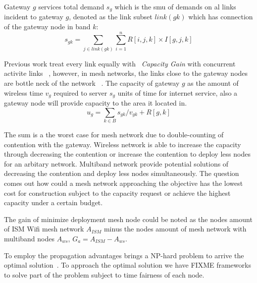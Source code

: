 Gateway $g$ services total demand $s_g$ which is the smu of demands on al links incident to gateway $g$, denoted as the link subset $link(gk)$ which has connection of the gateway node in band $k$:
\begin{equation}
s_{gk}=\sum_{j\in link(gk)} \sum_{i=1}^n R[i,j,k]\times I[g,j,k]
\end{equation}
 
Previous work treat every link equally with ~\emph{Capacity Gain} with concurrent activite links ~\cite{amiri2010utility}, however, in mesh networks, the links close to the gateway nodes are bottle neck of the network ~\cite{robinson2008adding}.
The capacity of gateway $g$ as the amount of wireless time $v_g$ required to server $s_g$ units of time for internet service, also a gateway node will provide capacity to the area it located in.
\begin{equation}
u_{g}=\sum_{k\in B} s_{gk}/v_{gk}+R[g,k]
\end{equation}

The sum is a the worst case for mesh network due to double-counting of contention with the gateway.
Wireless network is able to increase the capacity through decreasing the contention or increase the contention to deploy less nodes for an arbitary network. 
Multiband network provide potential solutions of decreasing the contention and deploy less nodes simultaneously. 
The question comes out how could a mesh network approaching the objective has the lowest cost for construction subject to the capacity request or achieve the highest capacity under a certain budget.


The gain of minimize deployment mesh node could be noted as the nodes amount of ISM Wifi mesh network $A_{ISM}$ minus the nodes amount of mesh network with multiband nodes $A_{ws}$, $G_a=A_{ISM}-A_{ws}$.

To employ the propagation advantages brings a NP-hard problem to arrive the optimal solution~\cite{arkoulis2013optimal}. 
To approach the optimal solution we have FIXME frameworks to solve part of the problem subject to time fairness of each node.

